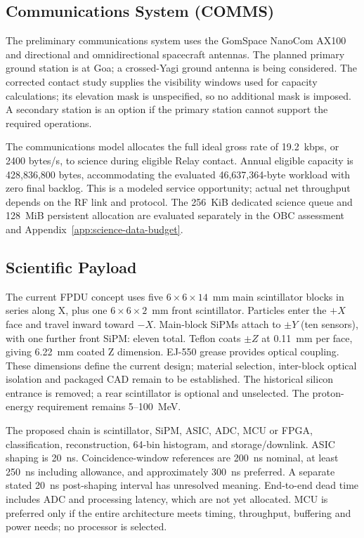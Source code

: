 
\subsection{Communications System (COMMS)}\label{communications-system-comms}
The preliminary communications system uses the GomSpace NanoCom AX100 and directional and omnidirectional spacecraft antennas. The planned primary ground station is at Goa; a crossed-Yagi ground antenna is being considered. The corrected contact study supplies the visibility windows used for capacity calculations; its elevation mask is unspecified, so no additional mask is imposed. A secondary station is an option if the primary station cannot support the required operations.

The communications model allocates the full ideal gross rate of 19.2~kbps, or 2400 bytes/s, to science during eligible Relay contact. Annual eligible capacity is 428,836,800 bytes, accommodating the evaluated 46,637,364-byte workload with zero final backlog. This is a modeled service opportunity; actual net throughput depends on the RF link and protocol. The 256~KiB dedicated science queue and 128~MiB persistent allocation are evaluated separately in the OBC assessment and Appendix~\ref{app:science-data-budget}.


\subsection{Scientific Payload}\label{payload-subsystem}
The current FPDU concept uses five $6\times6\times14$~mm main scintillator blocks in series along X, plus one $6\times6\times2$~mm front scintillator. Particles enter the $+X$ face and travel inward toward $-X$. Main-block SiPMs attach to $\pm Y$ (ten sensors), with one further front SiPM: eleven total. Teflon coats $\pm Z$ at 0.11~mm per face, giving 6.22~mm coated Z dimension. EJ-550 grease provides optical coupling. These dimensions define the current design; material selection, inter-block optical isolation and packaged CAD remain to be established. The historical silicon entrance is removed; a rear scintillator is optional and unselected. The proton-energy requirement remains 5--100~MeV.

The proposed chain is scintillator, SiPM, ASIC, ADC, MCU or FPGA, classification, reconstruction, 64-bin histogram, and storage/downlink. ASIC shaping is 20~ns. Coincidence-window references are 200~ns nominal, at least 250~ns including allowance, and approximately 300~ns preferred. A separate stated 20~ns post-shaping interval has unresolved meaning. End-to-end dead time includes ADC and processing latency, which are not yet allocated. MCU is preferred only if the entire architecture meets timing, throughput, buffering and power needs; no processor is selected.

